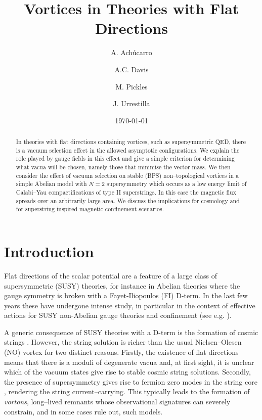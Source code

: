 \documentclass[a4paper,aps,prd,superscriptaddress,floats]{revtex4}
\begin{document}
\title{Vortices in Theories with Flat Directions}
\author{A. Ach\'{u}carro}
\author{A.C. Davis}
\author{M. Pickles}
\author{J. Urrestilla}
\date{\today}
\begin{abstract}

In theories with flat directions containing vortices, such as
supersymmetric QED, there is a vacuum selection effect in the allowed
asymptotic configurations. We explain the role played by gauge fields
in this effect and give a simple criterion for determining what vacua
will be chosen, namely those that minimise the vector mass.  We then
consider the effect of vacuum selection on stable (BPS)
non--topological vortices in a simple Abelian model with $N\!=\!2$
supersymmetry which occurs as a low energy limit of Calabi--Yau
compactifications of type II superstrings.  In this case the magnetic
flux spreads over an arbitrarily large area.  We discuss the
implications for cosmology and for superstring inspired magnetic
confinement scenarios.

\end{abstract}

\maketitle

\section{Introduction}
Flat directions of the scalar potential are a feature of a large class of
supersymmetric (SUSY) theories, for instance in Abelian theories
where the gauge symmetry is broken with a Fayet-Iliopoulos (FI) D-term. 
In the last few years these have undergone intense study, in particular 
in the context of effective actions for SUSY non-Abelian gauge theories
and confinement (see e.g. \cite{W.,dterm}).

A generic consequence of SUSY theories with a D-term is the formation of
cosmic strings \cite{PRTT96,DDT97}. However, the string solution is
richer than the usual Nielsen--Olesen (NO) vortex \cite{A57,NO73} for
two distinct reasons. Firstly, the existence of flat directions means
that there is a moduli of degenerate vacua and, at first sight, it is
unclear which of the vacuum states give rise to stable cosmic string
solutions. Secondly, the presence of supersymmetry gives rise to
fermion zero modes in the string core \cite{DDT97}, rendering the
string current--carrying. This typically leads to the formation of
{\it vortons}, long--lived remnants whose observational signatures can
severely constrain, and in some cases rule out, such models\cite{chiralvorton}.
\end{document}
